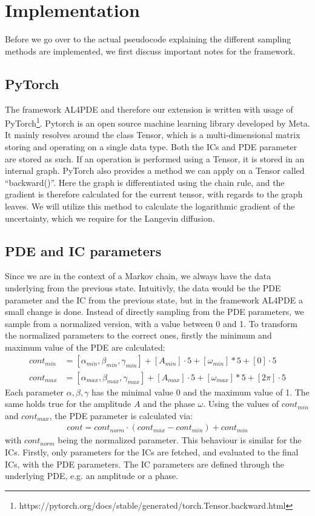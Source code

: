 \chapter{Implementation}\label{chap:implementation}
Before we go over to the actual pseudocode explaining the different sampling methods are implemented, we first discuss important notes for the framework.
\section{PyTorch}
The framework AL4PDE and therefore our extension is written with usage of PyTorch\footnote{https://pytorch.org/docs/stable/generated/torch.Tensor.backward.html}. Pytorch is an open source machine learning library developed by Meta.
It mainly resolves around the class Tensor, which is a multi-dimensional matrix storing and operating on a single data type. Both the ICs and PDE parameter are stored as such. If an operation is performed using a Tensor, it is stored in an internal graph. PyTorch also provides a method we can apply on a Tensor called ``backward()''. Here the graph is differentiated using the chain rule, and the gradient is therefore calculated for the current tensor, with regards to the graph leaves. We will utilize this method to calculate the logarithmic gradient of the uncertainty, which we require for the Langevin diffusion.
\section{PDE and IC parameters}
Since we are in the context of a Markov chain, we always have the data underlying from the previous state. 
Intuitivly, the data would be the PDE parameter and the IC from the previous state, but in the framework AL4PDE a small change is done.
Instead of directly sampling from the PDE parameters, we sample from a normalized version, with a value between 0 and 1. To transform the normalized parameters to the correct ones, firstly the minimum and maximum value of the PDE are calculated:
\begin{align}
    cont_{min} &= [\alpha_{min},\beta_{min},\gamma_{min}]+[A_{min}]\cdot5+[\omega_{min}]*5+[0]\cdot5\\
    cont_{max} &= [\alpha_{max},\beta_{max},\gamma_{max}]+[A_{max}]\cdot5+[\omega_{max}]*5+[2\pi]\cdot5
\end{align}
Each parameter $\alpha,\beta,\gamma$ has the minimal value 0 and the maximum value of 1. The same holds true for the amplitude $A$ and the phase $\omega$. 
Using the values of $cont_{min}$ and $cont_{max}$, the PDE parameter is calculated via:
\begin{align}
cont = cont_{norm}\cdot(cont_{max}-cont_{min})+cont_{min}
\end{align}
with $cont_{norm}$ being the normalized parameter. This behaviour is similar for the ICs. 
Firstly, only parameters for the ICs are fetched, and evaluated to the final ICs, with the PDE parameters. The IC parameters are defined through the underlying PDE, e.g. an amplitude or a phase.

